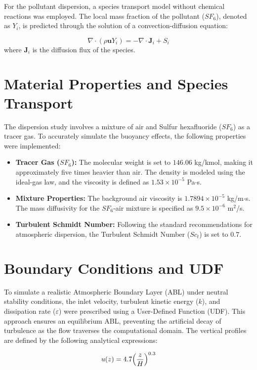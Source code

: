 \documentclass[11pt,a4paper]{report}
\begin{document}
For the pollutant dispersion, a species transport model without chemical reactions was employed. The local mass fraction of the pollutant ($SF_6$), denoted as $Y_i$, is predicted through the solution of a convection-diffusion equation:

\begin{equation}
  \nabla \cdot (\rho \mathbf{u} Y_i) = -\nabla \cdot \mathbf{J}_i + S_i
\end{equation}
where $\mathbf{J}_i$ is the diffusion flux of the species.


\section{Material Properties and Species Transport}
The dispersion study involves a mixture of air and Sulfur hexafluoride ($SF_6$) as a tracer gas. To accurately simulate the buoyancy effects, the following properties were implemented:
\begin{itemize}
    \item \textbf{Tracer Gas ($SF_6$):} The molecular weight is set to $146.06$ kg/kmol, making it approximately five times heavier than air. The density is modeled using the ideal-gas law, and the viscosity is defined as $1.53 \times 10^{-5}$ Pa$\cdot$s.
    \item \textbf{Mixture Properties:} The background air viscosity is $1.7894 \times 10^{-5}$ kg/m$\cdot$s. The mass diffusivity for the $SF_6$-air mixture is specified as $9.5 \times 10^{-6}$ m$^2$/s.
    \item \textbf{Turbulent Schmidt Number:} Following the standard recommendations for atmospheric dispersion, the Turbulent Schmidt Number ($Sc_t$) is set to $0.7$.
\end{itemize}

\section{Boundary Conditions and UDF}
To simulate a realistic Atmospheric Boundary Layer (ABL) under neutral stability conditions, the inlet velocity, turbulent kinetic energy ($k$), and dissipation rate ($\varepsilon$) were prescribed using a User-Defined Function (UDF). This approach ensures an equilibrium ABL, preventing the artificial decay of turbulence as the flow traverses the computational domain. The vertical profiles are defined by the following analytical expressions:

\begin{equation}
  u(z) = 4.7 \Bigl( \frac{z}{H} \Bigr)^{0.3}
  \label{eq:inlet_velocity}
\end{equation}
\end{document}
